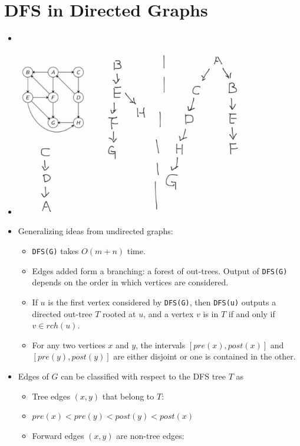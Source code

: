 \documentclass[12pt]{article}
\begin{document}
\section{DFS in Directed Graphs}
\begin{itemize}
    \item[] 
    \item[] \includegraphics[width=0.8\textwidth]{images/directed-dfs-tree-time.jpg}
    \item Generalizing ideas from undirected graphs:
    \begin{itemize}
        \item \texttt{DFS(G)} takes $O(m + n)$ time.
        \item Edges added form a branching: a forest of out-trees. Output of \texttt{DFS(G)} depends on the order in which vertices are considered.
        \item If $u$ is the first vertex considered by \texttt{DFS(G)}, then \texttt{DFS(u)} outputs a directed out-tree $T$ rooted at $u$, and a vertex $v$ is in $T$ if and only if $v \in rch(u)$.
        \item For any two vertices $x$ and $y$, the intervals $[pre(x), post(x)]$ and $[pre(y), post(y)]$ are either disjoint or one is contained in the other.
    \end{itemize}
    \item Edges of $G$ can be classified with respect to the DFS tree $T$ as
    \begin{itemize}
        \item Tree edges $(x, y)$ that belong to $T$:
        \item[] $pre(x) < pre(y) < post(y) < post(x)$
        \item Forward edges $(x, y)$ are non-tree edges:

\end{itemize}
\end{itemize}
\end{document}

